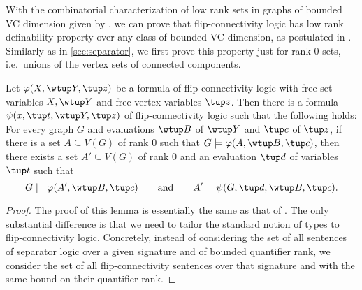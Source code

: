 With the combinatorial characterization of low rank sets in graphs of bounded VC dimension given by , we can prove that flip-connectivity logic has low rank definability property over any class of bounded VC dimension, as postulated in .
Similarly as in \cref{sec:separator}, we first prove this property just for rank $0$ sets, i.e.\ unions of the vertex sets of connected components.

\begin{lemma}
    \label{lem:rank-0-definable}
    Let $\varphi(X, \wtup Y, \tup z)$ be a formula of flip-connectivity logic with free set variables $X, \wtup Y$ and free vertex variables $\tup z$.
    Then there is a formula $\psi(x, \tup t, \wtup Y, \tup z)$ of flip-connectivity logic such that the following holds:
    For every graph $G$ and evaluations $\wtup B$ of $\wtup Y$ and $\tup c$ of $\tup z$, if there is a set $A \subseteq V(G)$ of rank $0$ such that $G \models \varphi(A, \wtup B, \tup c)$, then there exists a set $A' \subseteq V(G)$ of rank $0$ and an evaluation $\tup d$ of variables $\tup t$ such that
    \[G \models \varphi(A', \wtup B, \tup c)\qquad \textrm{and}\qquad A' = \psi(G, \tup d, \wtup B, \tup c).\]
\end{lemma}
\begin{proof}
    The proof of this lemma is essentially the same as that of .
    The only substantial difference is that we need to tailor the standard notion of types to flip-connectivity logic.
    Concretely, instead of considering the set of all sentences of separator logic over a given signature and of bounded quantifier rank, we consider the set of all flip-connectivity sentences  over that signature and with the same bound on their quantifier rank.
\end{proof}
    
